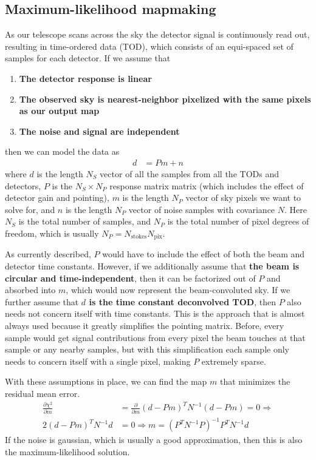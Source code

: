\documentclass[a4paper, 11pt]{article}
\newcommand{\assume}[1]{{\bf#1}}
\begin{document}
\subsection{Maximum-likelihood mapmaking}
As our telescope scans across the sky the detector signal is continuously read out,
resulting in time-ordered data (TOD), which consists of an equi-spaced set of samples
for each detector. If we assume that
\begin{enumerate}
	\item \assume{The detector response is linear}
	\item \assume{The observed sky is nearest-neighbor pixelized with the same pixels as our output map}
	\item \assume{The noise and signal are independent}
\end{enumerate}
then we can model the data as
\begin{align}
	d &= Pm + n
\end{align}
where $d$ is the length $N_S$ vector of all the samples from all the
TODs and detectors, $P$ is the $N_S\times N_P$ response
matrix matrix (which includes the effect of detector gain and pointing),
$m$ is the length $N_P$ vector of sky pixels we want to solve for, and
$n$ is the length $N_P$ vector of noise samples with covariance $N$. Here $N_S$ is the
total number of samples, and $N_P$ is the total number of pixel degrees
of freedom, which is usually $N_P = N_\textrm{stokes}N_\textrm{pix}$.

As currently described, $P$ would have to include the effect of both the
beam and detector time constants. However, if we additionally assume that
\assume{the beam is circular and time-independent}, then it can be factorized out
of $P$ and absorbed into $m$, which would now represent the beam-convoluted sky.
If we further assume that \assume{$d$ is the time constant deconvolved TOD}, then $P$ also needs not
concern itself with time constants.
This is the approach that is almost always used because it greatly simplifies
the pointing matrix. Before, every sample would get signal contributions from
every pixel the beam touches at that sample or any nearby samples, but with this
simplification each sample only needs to concern itself with a single pixel,
making $P$ extremely sparse.

With these assumptions in place, we can find the map $m$ that minimizes the
residual mean error.
\begin{align}
	\frac{\partial\chi^2}{\partial m} &= \frac{\partial}{\partial m}(d-Pm)^T N^{-1}(d-Pm) = 0 \Rightarrow \\
	2(d-Pm)^T N^{-1}d &= 0 \Rightarrow
	m = (P^TN^{-1}P)^{-1} P^TN^{-1} d
\end{align}
If the noise is gaussian, which is usually a good approximation, then this is also
the maximum-likelihood solution.
\end{document}
